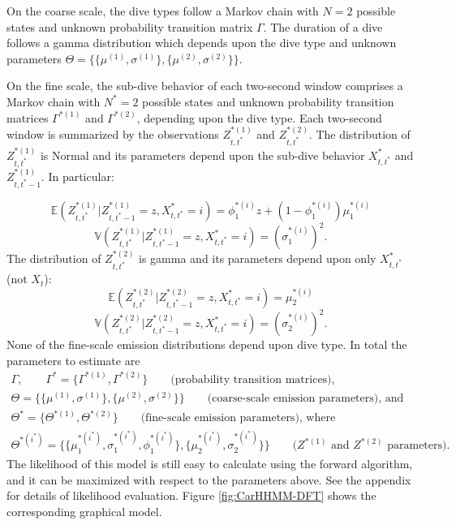 On the coarse scale, the dive types follow a Markov chain with $N=2$ possible states and unknown probability transition matrix $\Gamma$. The duration of a dive follows a gamma distribution which depends upon the dive type and unknown parameters $\Theta = \{\{\mu^{(1)},\sigma^{(1)}\},\{\mu^{(2)},\sigma^{(2)}\}\}$.

On the fine scale, the sub-dive behavior of each two-second window comprises a Markov chain with $N^*=2$ possible states and unknown probability transition matrices $\Gamma^{*(1)}$ and $\Gamma^{*(2)}$, depending upon the dive type. Each two-second window is summarized by the observations $Z^{*(1)}_{t,t^*}$ and $Z^{*(2)}_{t,t^*}$. The distribution of $Z^{*(1)}_{t,t^*}$ is Normal and its parameters depend upon the sub-dive behavior $X^*_{t,t^*}$ and $Z^{*(1)}_{t,t^*-1}$. In particular:

$$\mathbb{E}(Z^{*(1)}_{t,t^*}|Z^{*(1)}_{t,t^*-1} = z,X^*_{t,t^*} = i) = \phi_1^{*(i)}z + (1-\phi_1^{*(i)}) \mu_1^{*(i)}$$
$$\mathbb{V}(Z^{*(1)}_{t,t^*}|Z^{*(1)}_{t,t^*-1} = z,X^*_{t,t^*} = i) = \left(\sigma_1^{*(i)}\right)^2.$$
%
The distribution of $Z^{*(2)}_{t,t^*}$ is gamma and its parameters depend upon only $X^*_{t,t^*}$ (not $X_t$):
%
$$\mathbb{E}(Z^{*(2)}_{t,t^*}|Z^{*(2)}_{t,t^*-1} = z,X^*_{t,t^*} = i) = \mu_2^{*(i)}$$
$$\mathbb{V}(Z^{*(2)}_{t,t^*}|Z^{*(2)}_{t,t^*-1} = z,X^*_{t,t^*} = i) = \left(\sigma_2^{*(i)}\right)^2.$$
%
None of the fine-scale emission distributions depend upon dive type. In total the parameters to estimate are
%
\begin{gather*}
    \Gamma, \qquad \Gamma^{*} = \{\Gamma^{*(1)},\Gamma^{*(2)}\} \qquad \text{(probability transition matrices)}, \\
    \Theta = \{\{\mu^{(1)},\sigma^{(1)}\},\{\mu^{(2)},\sigma^{(2)}\}\} \qquad \text{(coarse-scale emission parameters), and} \\
    \Theta^* = \{\Theta^{*(1)},\Theta^{*(2)}\}  \qquad \text{(fine-scale emission parameters), where} \\
    \Theta^{*(i^*)} =  \{\{\mu_1^{*(i^*)},\sigma_1^{*(i^*)},\phi_1^{*(i^*)}\},\{\mu_2^{*(i^*)},\sigma_2^{*(i^*)}\}\} \qquad \text{(}Z^{*(1)} \text{ and } Z^{*(2)} \text{ parameters).}
\end{gather*}
%
The likelihood of this model is still easy to calculate using the forward algorithm, and it can be maximized with respect to the parameters above. See the appendix for details of likelihood evaluation. Figure \ref{fig:CarHHMM-DFT} shows the corresponding graphical model.

